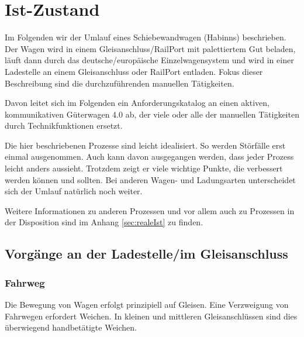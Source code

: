 \section{Ist-Zustand}\label{sec:Istzustand} %
Im Folgenden wir der Umlauf eines \gls{Schiebewandwagen} (Habinns) beschrieben. Der Wagen wird in einem \gls{Gleisanschluss}/RailPort mit palettiertem Gut beladen, läuft dann durch das deutsche/europäische Einzelwagensystem und wird in einer Ladestelle an einem \gls{Gleisanschluss} oder RailPort entladen. Fokus dieser Beschreibung sind die durchzuführenden manuellen Tätigkeiten.\par
Davon leitet sich im Folgenden ein Anforderungskatalog an einen aktiven, kommunikativen Güterwagen 4.0 ab, der viele oder alle der manuellen Tätigkeiten durch Technikfunktionen ersetzt.\par
Die hier beschriebenen Prozesse sind leicht idealisiert. So werden Störfälle erst einmal ausgenommen. Auch kann davon ausgegangen werden, dass jeder Prozess leicht anders aussieht. Trotzdem zeigt er viele wichtige Punkte, die verbessert werden können und sollten. Bei anderen Wagen- und Ladungsarten unterscheidet sich der Umlauf natürlich noch weiter.\par
Weitere Informationen zu anderen Prozessen und vor allem auch zu Prozessen in der Disposition sind im Anhang \ref{sec:realeIst} zu finden. \par
\subsection{Vorgänge an der Ladestelle/im Gleisanschluss}\label{sec:Ladestelle}
\subsubsection{Fahrweg} \label{sec:Fahrweg}
Die Bewegung von Wagen erfolgt prinzipiell auf Gleisen. Eine Verzweigung von Fahrwegen erfordert Weichen. In kleinen und mittleren Gleisanschlüssen sind dies überwiegend handbetätigte Weichen. 
